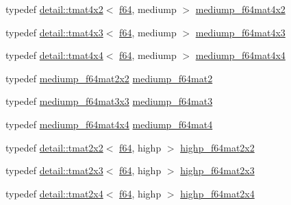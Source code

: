 \begin{DoxyCompactItemize}
\item 
typedef \hyperlink{structglm_1_1detail_1_1tmat4x2}{detail\+::tmat4x2}$<$ \hyperlink{group__gtc__type__precision_ga2bba392e555124b36cde6abba349bab3}{f64}, mediump $>$ \hyperlink{group__gtc__type__precision_ga4a7a2b6889f08c9209a4f994fd87cc4e}{mediump\+\_\+f64mat4x2}
\item 
typedef \hyperlink{structglm_1_1detail_1_1tmat4x3}{detail\+::tmat4x3}$<$ \hyperlink{group__gtc__type__precision_ga2bba392e555124b36cde6abba349bab3}{f64}, mediump $>$ \hyperlink{group__gtc__type__precision_ga4a920abfb082b0ffd8d89614cb787021}{mediump\+\_\+f64mat4x3}
\item 
typedef \hyperlink{structglm_1_1detail_1_1tmat4x4}{detail\+::tmat4x4}$<$ \hyperlink{group__gtc__type__precision_ga2bba392e555124b36cde6abba349bab3}{f64}, mediump $>$ \hyperlink{group__gtc__type__precision_ga941e42a0b337b5c8ad9c324aaa6b2ad5}{mediump\+\_\+f64mat4x4}
\item 
typedef \hyperlink{group__gtc__type__precision_gacfa9f872c78d9e8b8e6c5dd0088db8fc}{mediump\+\_\+f64mat2x2} \hyperlink{group__gtc__type__precision_gaa7eac0340d2aaf670ec4dfbd1826fd35}{mediump\+\_\+f64mat2}
\item 
typedef \hyperlink{group__gtc__type__precision_ga871b69a221dae7461aa746e6e6d372fc}{mediump\+\_\+f64mat3x3} \hyperlink{group__gtc__type__precision_gae38a4a0b57e25d9cbb153dcaab9432ec}{mediump\+\_\+f64mat3}
\item 
typedef \hyperlink{group__gtc__type__precision_ga941e42a0b337b5c8ad9c324aaa6b2ad5}{mediump\+\_\+f64mat4x4} \hyperlink{group__gtc__type__precision_ga2763f655bfe2141a014e66d26a9d2f18}{mediump\+\_\+f64mat4}
\item 
typedef \hyperlink{structglm_1_1detail_1_1tmat2x2}{detail\+::tmat2x2}$<$ \hyperlink{group__gtc__type__precision_ga2bba392e555124b36cde6abba349bab3}{f64}, highp $>$ \hyperlink{group__gtc__type__precision_ga4babca568fc88f185620c02e4fdac0d8}{highp\+\_\+f64mat2x2}
\item 
typedef \hyperlink{structglm_1_1detail_1_1tmat2x3}{detail\+::tmat2x3}$<$ \hyperlink{group__gtc__type__precision_ga2bba392e555124b36cde6abba349bab3}{f64}, highp $>$ \hyperlink{group__gtc__type__precision_gafb5b42b29b3bd7f1605483223fa35312}{highp\+\_\+f64mat2x3}
\item 
typedef \hyperlink{structglm_1_1detail_1_1tmat2x4}{detail\+::tmat2x4}$<$ \hyperlink{group__gtc__type__precision_ga2bba392e555124b36cde6abba349bab3}{f64}, highp $>$ \hyperlink{group__gtc__type__precision_ga72fae79e6633cbc6bf691f69278b36d3}{highp\+\_\+f64mat2x4}

\end{DoxyCompactItemize}
